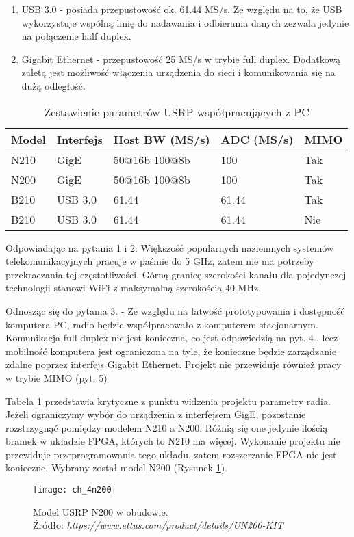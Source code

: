 \begin{enumerate}
\item USB 3.0 - posiada przepustowość ok. 61.44 MS/s.
Ze względu na to, że USB wykorzystuje wspólną linię do nadawania i odbierania danych zezwala jedynie na połączenie half duplex.
\item Gigabit Ethernet - przepustowość 25 MS/s w trybie full duplex. Dodatkową zaletą jest możliwość włączenia urządzenia do sieci i komunikowania się na dużą odległość.
\end{enumerate}

\begin{table}[t]
\caption{Zestawienie parametrów USRP współpracujących z PC}
\label{usrp_table}
\centering
\begin{tabular}{|l|l|l|l|l|}
\hline
Model & Interfejs & Host BW (MS/s) & ADC (MS/s) & MIMO \\
\hline
N210 & GigE & 50@16b 100@8b  & 100 & Tak \\
\hline
N200 & GigE & 50@16b 100@8b  & 100 & Tak \\
\hline
B210 & USB 3.0 & 61.44 & 61.44 & Tak \\
\hline
B210 & USB 3.0 & 61.44 & 61.44 & Nie \\
\hline
\end{tabular}
\end{table}


Odpowiadając na pytania 1 i 2: Większość popularnych naziemnych systemów telekomunikacyjnych pracuje w paśmie do 5 GHz, zatem nie ma potrzeby przekraczania tej częstotliwości. Górną granicę szerokości kanału dla pojedynczej technologii stanowi WiFi z maksymalną szerokością 40 MHz. \cite{802.11}

Odnosząc się do pytania 3. - Ze względu na łatwość prototypowania i dostępność komputera PC, radio będzie współpracowało z komputerem stacjonarnym. Komunikacja full duplex nie jest konieczna, co jest odpowiedzią na pyt. 4., lecz mobilność komputera jest ograniczona na tyle, że konieczne będzie zarządzanie zdalne poprzez interfejs Gigabit Ethernet. Projekt nie przewiduje również pracy w trybie MIMO (pyt. 5)

Tabela \ref{usrp_table} przedstawia krytyczne z punktu widzenia projektu parametry radia. Jeżeli ograniczymy wybór do urządzenia z interfejsem GigE, pozostanie rozstrzygnąć pomiędzy modelem N210 a N200. Różnią się one jedynie ilością bramek w układzie FPGA, których to N210 ma więcej. Wykonanie projektu nie przewiduje przeprogramowania tego układu, zatem rozszerzanie FPGA nie jest konieczne. Wybrany został model N200 (Rysunek \ref{n200}).

\begin{figure}[t]
\texttt{[image: ch\_4n200]}
\centering
\caption[Model USRP N200 w obudowie.; Źródło: \textit{https://www.ettus.com/product/details/UN200-KIT}]{Model USRP N200 w obudowie. \\ Źródło: \textit{https://www.ettus.com/product/details/UN200-KIT}\endtabular}
\label{n200}
\end{figure}






